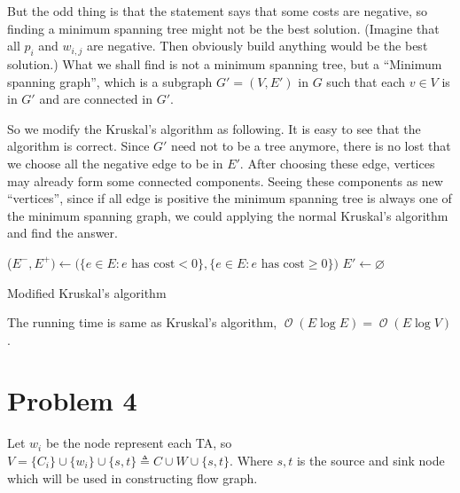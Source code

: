 \documentclass[12pt, a4paper]{article}
\newcommand{\opord}{\operatorname{\mathcal{O}}}
\newcommand{\ord}[1]{\opord\left(#1\right)}
\begin{document}
But the odd thing is that the statement says that some costs are negative, so finding a minimum
spanning tree might not be the best solution. (Imagine that all $p_i$ and $w_{i, j}$ are negative.
Then obviously build anything would be the best solution.) What we shall find is not a minimum
spanning tree, but a ``Minimum spanning graph'', which is a subgraph $G' = (V, E')$
in $G$ such that each $v \in V$ is in $G'$ and are connected in $G'$.

So we modify the Kruskal's algorithm as following. It is easy to see that the algorithm is correct.
Since $G'$ need not to be a tree anymore, there is no lost that we choose all
the negative edge to be in $E'$. After choosing these edge, vertices may already form some
connected components. Seeing these components as new ``vertices'',
since if all edge is positive the minimum spanning tree is always one of the
minimum spanning graph, we could applying the normal Kruskal's algorithm and find the answer.
\LinesNumbered
\begin{algorithm}[H]
  \DontPrintSemicolon
  \BlankLine
  ($E^-, E^+) \gets \big( \{e \in E: e \text{ has cost} < 0\}, \{e \in E: e \text{ has cost} \geq 0\} \big)$ \; 
  $E' \gets \varnothing$ \;
  \caption{Modified Kruskal's algorithm}
\end{algorithm}

The running time is same as Kruskal's algorithm, $\ord{E \log E} = \ord{E \log V}$.

\section{Problem 4}
Let $w_{i}$ be the node represent each TA, so $V = \{C_i\} \cup \{w_i\} \cup \{s, t\} \triangleq C \cup W \cup \{s, t\}$.
Where $s, t$ is the source and sink node which will be used in constructing flow graph.
\end{document}
